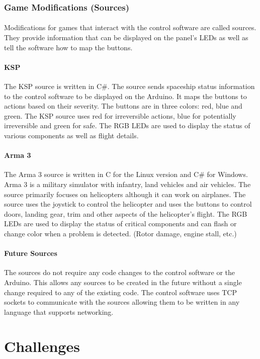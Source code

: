 \documentclass[12pt,a4paper]{article}
\begin{document}
			\subsubsection{Game Modifications (Sources)}
				\paragraph{}
					Modifications for games that interact with the control software are called sources. They provide information that can be displayed on the panel's \glspl{LED} as well as tell the software how to map the buttons.
				\paragraph{\gls{KSP}}
					The \gls{KSP} source is written in C\#. The source sends spaceship status information to the control software to be displayed on the Arduino. It maps the buttons to actions based on their severity. The buttons are in three colors: red, blue and green. The \gls{KSP} source uses red for irreversible actions, blue for potentially irreversible and green for safe. The \gls{RGB} \glspl{LED} are used to display the status of various components as well as flight details.
				\paragraph{Arma 3}
					The Arma 3 source is written in C for the Linux version and C\# for Windows. Arma 3 is a military simulator with infantry, land vehicles and air vehicles. The source primarily focuses on helicopters although it can work on airplanes. The source uses the joystick to control the helicopter and uses the buttons to control doors, landing gear, trim and other aspects of the helicopter's flight. The \gls{RGB} \glspl{LED} are used to display the status of critical components and can flash or change color when a problem is detected. (Rotor damage, engine stall, etc.)
				\paragraph{Future Sources}
					The sources do not require any code changes to the control software or the Arduino. This allows any sources to be created in the future without a single change required to any of the existing code. The control software uses \gls{TCP} sockets to communicate with the sources allowing them to be written in any language that supports networking.
	\section{Challenges}
\end{document}
